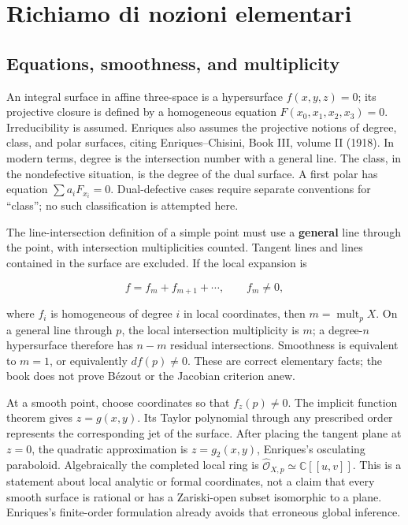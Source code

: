 \section{Richiamo di nozioni elementari}
\label{enriques-intro-1}

\subsection{Equations, smoothness, and multiplicity}

An integral surface in affine three-space is a hypersurface \(f(x,y,z)=0\); its projective closure is defined by a homogeneous equation \(F(x_0,x_1,x_2,x_3)=0\). Irreducibility is assumed. Enriques also assumes the projective notions of degree, class, and polar surfaces, citing Enriques--Chisini, Book III, volume II (1918). In modern terms, degree is the intersection number with a general line. The class, in the nondefective situation, is the degree of the dual surface. A first polar has equation \(\sum a_i F_{x_i}=0\). Dual-defective cases require separate conventions for ``class''; no such classification is attempted here.

The line-intersection definition of a simple point must use a \textbf{general} line through the point, with intersection multiplicities counted. Tangent lines and lines contained in the surface are excluded. If the local expansion is

\[
f=f_m+f_{m+1}+\cdots,\qquad f_m\ne0,
\]

where \(f_i\) is homogeneous of degree \(i\) in local coordinates, then \(m=\operatorname{mult}_pX\). On a general line through \(p\), the local intersection multiplicity is \(m\); a degree-\(n\) hypersurface therefore has \(n-m\) residual intersections. Smoothness is equivalent to \(m=1\), or equivalently \(df(p)\ne0\). These are correct elementary facts; the book does not prove Bézout or the Jacobian criterion anew.

At a smooth point, choose coordinates so that \(f_z(p)\ne0\). The implicit function theorem gives \(z=g(x,y)\). Its Taylor polynomial through any prescribed order represents the corresponding jet of the surface. After placing the tangent plane at \(z=0\), the quadratic approximation is \(z=g_2(x,y)\), Enriques's osculating paraboloid. Algebraically the completed local ring is \(\widehat{\mathcal O}_{X,p}\simeq\mathbb C[[u,v]]\). This is a statement about local analytic or formal coordinates, not a claim that every smooth surface is rational or has a Zariski-open subset isomorphic to a plane. Enriques's finite-order formulation already avoids that erroneous global inference.

